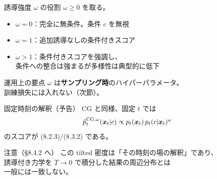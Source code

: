 \asmain
\begin{frame}{誘導強度 $\omega$ の役割}
    $\omega\ge 0$ を取る。
    \begin{itemize}
        \item $\omega=0$：完全に無条件。条件 $c$ を無視
        \item $\omega=1$：追加誘導なしの条件付きスコア
        \item $\omega>1$：条件付きスコアを強調し、\\
        条件への整合は強まるが多様性は典型的に低下
    \end{itemize}
    \begin{block}{運用上の要点}
        $\omega$ は\textbf{サンプリング時}のハイパーパラメータ。\\
        訓練損失には入れない（次節）。
    \end{block}
\end{frame}
\asmain
\begin{frame}{固定時刻の解釈（予告）}
    CG と同様、固定 $t$ では
    \[
        \tilde p_t^{\mathrm{CG},\omega}(\bm{x}_t|c)
        \propto
        p_t(\bm{x}_t)\,p_t(c|\bm{x}_t)^{\omega}
    \]
    のスコアが (8.2.3)/(8.3.2) である。
    \begin{alertblock}{注意（§8.4.2 へ）}
        この tilted 密度は「その時刻の場の解釈」であり、\\
        誘導付き力学を $T\to 0$ で積分した結果の周辺分布とは\\
        一般には一致しない。
    \end{alertblock}
\end{frame}

